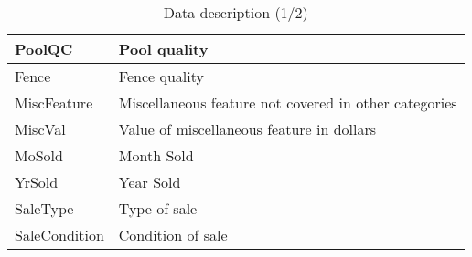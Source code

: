 \begin{table}[H]
\begin{longtable}{|l|l|}
        \hline
        PoolQC        & Pool quality                                                \\
        \hline
        Fence         & Fence quality                                               \\
        \hline
        MiscFeature   & Miscellaneous feature not covered in other categories       \\
        \hline
        MiscVal       & Value of miscellaneous feature in dollars                   \\
        \hline
        MoSold        & Month Sold                                                  \\
        \hline
        YrSold        & Year Sold                                                   \\
        \hline
        SaleType      & Type of sale                                                \\
        \hline
        SaleCondition & Condition of sale                                           \\
        \hline
    \end{longtable}

    \caption{Data description (1/2)}
    \label{tab:data_description_1}

\end{table}
